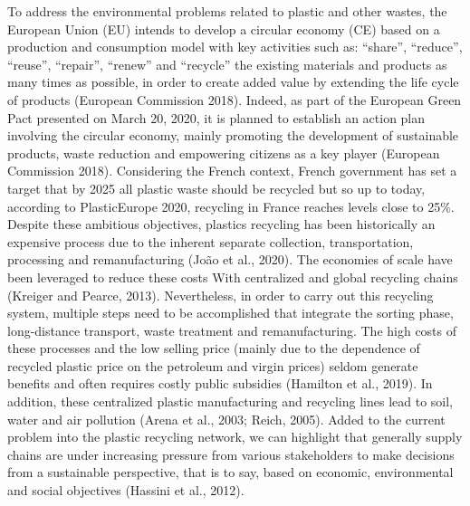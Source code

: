 \documentclass[]{elsarticle} %
\begin{document}
To address the environmental problems related to plastic and other wastes, the European Union (EU) intends to develop a circular economy (CE) based on a production and consumption model with key activities such as: ``share'', ``reduce'', ``reuse'', ``repair'', ``renew'' and ``recycle'' the existing materials and products as many times as possible, in order to create added value by extending the life cycle of products (European Commission 2018).
Indeed, as part of the European Green Pact presented on March 20, 2020, it is planned to establish an action plan involving the circular economy, mainly promoting the development of sustainable products, waste reduction and empowering citizens as a key player (European Commission 2018).
Considering the French context, French government has set a target that by 2025 all plastic waste should be recycled but so up to today, according to PlasticEurope 2020, recycling in France reaches levels close to 25\%.
Despite these ambitious objectives, plastics recycling has been historically an expensive process due to the inherent separate collection, transportation, processing and remanufacturing (João et al., 2020). The economies of scale have been leveraged to reduce these costs With centralized and global recycling chains (Kreiger and Pearce, 2013).
Nevertheless, in order to carry out this recycling system, multiple steps need to be accomplished that integrate the sorting phase, long-distance transport, waste treatment and remanufacturing.
The high costs of these processes and the low selling price (mainly due to the dependence of recycled plastic price on the petroleum and virgin prices) seldom generate benefits and often requires costly public subsidies (Hamilton et al., 2019).
In addition, these centralized plastic manufacturing and recycling lines lead to soil, water and air pollution (Arena et al., 2003; Reich, 2005).
Added to the current problem into the plastic recycling network, we can highlight that generally supply chains are under increasing pressure from various stakeholders to make decisions from a sustainable perspective, that is to say, based on economic, environmental and social objectives (Hassini et al., 2012).
\end{document}

